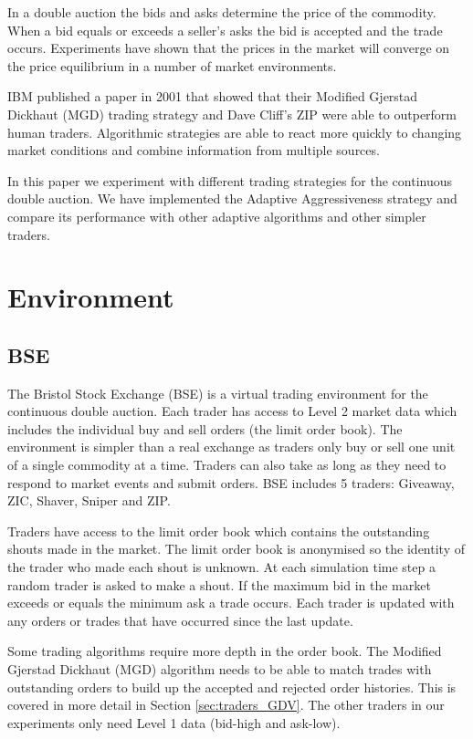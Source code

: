 \documentclass[preprint]{acm_proc_article-sp} %
\begin{document}
In a double auction the bids and asks determine the price of the commodity.
When a bid equals or exceeds a seller's asks the bid is accepted and the trade
occurs. Experiments have shown  that the prices in the market will
 converge on the price equilibrium in a number of market
environments\cite{smith_1962}.

IBM published a paper in 2001 that showed that their Modified Gjerstad Dickhaut (MGD) trading strategy and
Dave Cliff's ZIP were able to outperform human traders\cite{ibm_human}.
Algorithmic strategies are able to react more quickly to changing market
conditions and combine information from multiple sources.

In this paper we experiment with different trading strategies for the
continuous double auction.
We have implemented the Adaptive Aggressiveness\cite{AA_thesis} strategy and compare its performance with other adaptive algorithms and other simpler traders.\\



\section{Environment} \label{sec:environment}
\subsection{BSE} \label{sec:BSE}
The Bristol Stock Exchange (BSE) is a virtual trading environment for the
continuous double auction. Each trader has access to Level 2 market data which
includes the individual buy and sell orders (the limit order book). The
environment is simpler than a real exchange as traders only buy or sell one
unit of a single commodity at a time. Traders can also take as long as they
need to respond to market events and submit orders. BSE includes 5 traders: Giveaway, ZIC, Shaver, Sniper and ZIP.

Traders have access to the limit order book which contains the outstanding
shouts made in the market. The limit order book is anonymised so the identity
of the trader who made each shout is unknown. At each simulation time step a
random trader is asked to make a shout. If the maximum bid in the market
exceeds or equals the minimum ask a trade occurs. Each trader is updated with
any orders or trades that have occurred since the last update.

Some trading algorithms require more depth in the order book. The Modified
Gjerstad Dickhaut (MGD) algorithm needs to be able to match trades with
outstanding orders to build up the accepted and rejected order histories.
This is covered in more detail in Section \ref{sec:traders_GDV}. The
other traders in our experiments only need Level 1 data
(bid-high and ask-low).
\end{document}
